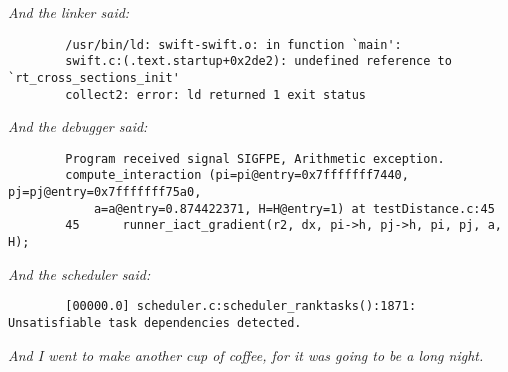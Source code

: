 \textit{And the linker said:}

\begin{lstlisting}
        /usr/bin/ld: swift-swift.o: in function `main':
        swift.c:(.text.startup+0x2de2): undefined reference to `rt_cross_sections_init'
        collect2: error: ld returned 1 exit status
\end{lstlisting}




\textit{And the debugger said:}

\begin{lstlisting}
        Program received signal SIGFPE, Arithmetic exception.
        compute_interaction (pi=pi@entry=0x7fffffff7440, pj=pj@entry=0x7fffffff75a0, 
            a=a@entry=0.874422371, H=H@entry=1) at testDistance.c:45
        45	    runner_iact_gradient(r2, dx, pi->h, pj->h, pi, pj, a, H);
\end{lstlisting}


\textit{And the scheduler said:}

\begin{lstlisting}
        [00000.0] scheduler.c:scheduler_ranktasks():1871: Unsatisfiable task dependencies detected.
\end{lstlisting}

\vspace{3mm}

\textit{And I went to make another cup of coffee, for it was going to be a long night.}



